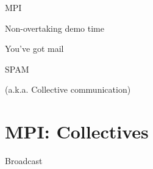 \documentclass[english,compress]{beamer}
\begin{document}
\begin{frame}{MPI}
  \begin{center}
  \Huge Non-overtaking demo time
  \end{center}
\end{frame}
\begin{frame}{You've got mail}
  \begin{center}
    {\Huge SPAM}

  \bigskip
  (a.k.a. Collective communication)
  \end{center}
\end{frame}
\section{MPI: Collectives}
\def\collectivenodesmem#1#2{
  \foreach\rank in {0,1,2,3}
  {
    \foreach\memloc in {0,1,2,3}
    {
      \coordinate (#1-rank\rank-\memloc) at (\memloc,-\rank*1.25) ;
      \ifthenelse{\equal{#2}{1}}{
        \draw (#1-rank\rank-\memloc) ++(-0.5,-0.5) rectangle ++(1,1);
      }{}
    }
    \draw [ultra thick] (#1-rank\rank-0) ++(-0.5,-0.5) rectangle ++(4,1);
  }
  \coordinate (#1-tail) at ($ 0.5*(#1-rank2-3)+0.5*(#1-rank1-3) + (1,0) $);
  \coordinate (#1-head) at ($ 0.5*(#1-rank2-0)+0.5*(#1-rank1-0) - (1,0) $);
}
\def\collsetup#1{
  \collectivenodesmem{before}{#1}
  \begin{scope}[xshift=7.5cm]
    \collectivenodesmem{after}{#1}
  \end{scope}
  \draw [->] (before-head) ++(0.25,2) -- ++(0,-4)
  node [anchor=south,pos=0.5,rotate=90] {Ranks (Processors)};
  \draw [->] (before-rank0-0) ++(0,0.75) -- ++(3,0)
  node [anchor=south,pos=0.5] {Memory};
}
\begin{frame}{Broadcast}
  \begin{center}
  \end{center}
\end{frame}
\end{document}
